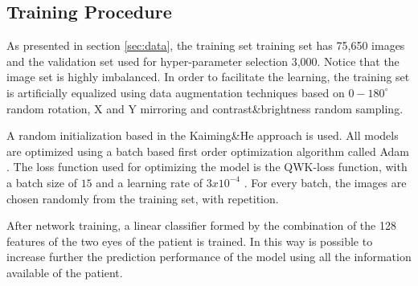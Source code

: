 \documentclass[review]{elsarticle}
\theoremstyle{definition} %
\theoremstyle{remark}
\begin{document}
\subsection{Training Procedure}

As presented in section \ref{sec:data}, the training set training set has 75,650 images and the validation set used for hyper-parameter selection 3,000. Notice that the image set is highly imbalanced. In order to facilitate the learning, the training set is artificially equalized using data augmentation techniques \cite{Krizhevsky:2012} based on $0-180^{\circ}$ random rotation, X and Y mirroring and contrast\&brightness random sampling.

A random initialization based in the Kaiming\&He approach \cite{kaiming} is used. All models are optimized using a batch based first order optimization algorithm called Adam \cite{DBLP:journals/corr/KingmaB14}. The loss function used for optimizing the model is the QWK-loss function, with a batch size of $15$ and a learning rate of $3x10^{-4}$ \cite{DELATORRE2017}. For every batch, the images are chosen randomly from the training set, with repetition. 

After network training, a linear classifier formed by the combination of the 128 features of the two eyes of the patient is trained. In this way is possible to increase further the prediction performance of the model using all the information available of the patient.
\end{document}
